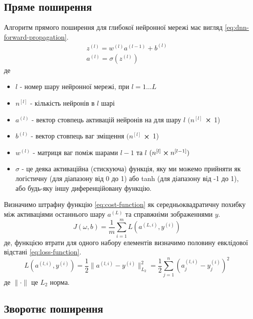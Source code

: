 \documentclass[14pt,a4paper]{extarticle}
\newcounter{e}
\numberwithin{equation}{section}
\numberwithin{figure}{section}
\newcommand{\ith}{^{(i)}}
\newcommand{\lth}{^{(l)}}
\begin{document}
	\subsection{Пряме поширення}
	Алгоритм прямого поширення для глибокої нейронної мережі має вигляд \ref{eq:dnn-forward-propagation}.
	\begin{equation}
		\label{eq:dnn-forward-propagation}
		\begin{array}{l}
			\displaystyle
			z\lth=w^{(l)} a^{(l-1)}+b\lth
			\\[0.7cm]
			
			\displaystyle
			a\lth=\sigma (z\lth)
		\end{array}
	\end{equation}
	де
	\begin{itemize}
		\item $l$ - номер шару нейронної мережі, при $l = 1 \dotsc L$
		\item $n^{[l]}$ - кількість нейронів в $l$ шарі
		\item $a\lth$ - вектор стовпець активацій нейронів на для шару $l$ $(n^{[l]}$ $\cross$ 1)
		\item $b\lth$ - вектор стовпець ваг зміщення $(n^{[l]}$ $\cross$ 1)
		\item $w\lth$ - матриця ваг поміж шарами $l-1$ та $l$ $(n^{[l]} \cross n^{[l - 1]})$ 
		\item $\sigma$ - це деяка активаційна (стискуюча) функція, яку ми можемо прийняти як логістичну (для діапазону від 0 до 1) або tanh (для діапазону від -1 до 1), або будь-яку іншу диференційовану функцію.
	\end{itemize}
	
	Визначимо штрафну функцію \ref{eq:cost-function} як середньоквадратичну похибку між активаціями останнього шару $a^{(L)}$ та справжніми зображеннями $y$.
	\begin{equation}
		\label{eq:cost-function}
		J(\omega, b) =  \frac{1}{m}  \sum_{i=1}^{m} L(a^{(L, i)}, y\ith)
	\end{equation}
	де, функцією втрати для одного набору елементів визначимо половину евклідової відстані \ref{eq:loss-function}.
	\begin{equation}
		\label{eq:loss-function}
		L(a^{(l, i)}, y\ith)  =  \frac{1}{2}  \| a^{(l, i)}  - y\ith \|_{L_2}^{2} = \frac{1}{2} \sum_{j=1}^{n}  (a^{(l, i)}_j -  y\ith_j)^2
	\end{equation}
	де $\| \cdot \|$ це $L_2$ норма.

	\subsection{Зворотнє поширення}
\end{document}
